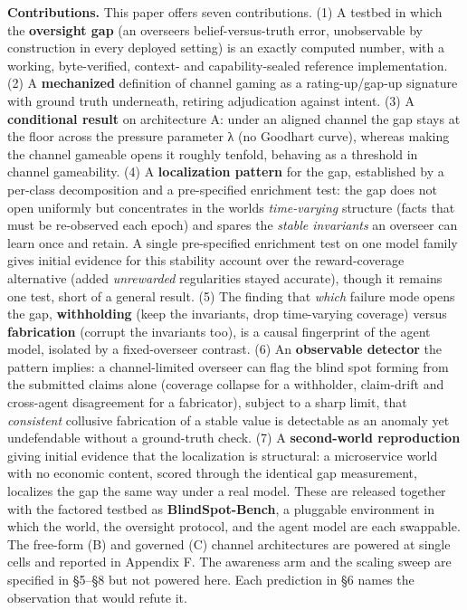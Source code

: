 \documentclass[11pt]{article}
\begin{document}
\textbf{Contributions.} This paper offers seven contributions. (1) A
testbed in which the \textbf{oversight gap} (an
overseer\textquotesingle s belief-versus-truth error, unobservable by
construction in every deployed setting) is an exactly computed number,
with a working, byte-verified, context- and capability-sealed reference
implementation. (2) A \textbf{mechanized} definition of channel gaming
as a rating-up/gap-up signature with ground truth underneath, retiring
adjudication against intent. (3) A \textbf{conditional result} on
architecture A: under an aligned channel the gap stays at the floor
across the pressure parameter λ (no Goodhart curve), whereas making the
channel gameable opens it roughly tenfold, behaving as a threshold in
channel gameability. (4) A
\textbf{localization pattern} for the gap, established by a per-class
decomposition and a pre-specified enrichment test: the gap does not open
uniformly but concentrates in the world\textquotesingle s
\emph{time-varying} structure (facts that must be re-observed each
epoch) and spares the \emph{stable invariants} an overseer can learn
once and retain. A single pre-specified enrichment test on one model
family gives initial evidence for this stability account over the
reward-coverage alternative (added \emph{unrewarded} regularities stayed
accurate), though it remains one test, short of a general result. (5)
The finding that \emph{which} failure mode opens the gap,
\textbf{withholding} (keep the invariants, drop time-varying coverage)
versus \textbf{fabrication} (corrupt the invariants too), is a causal
fingerprint of the agent model, isolated by a fixed-overseer
contrast. (6) An \textbf{observable detector} the pattern implies: a
channel-limited overseer can flag the blind spot forming from the
submitted claims alone (coverage collapse for a withholder, claim-drift
and cross-agent disagreement for a fabricator), subject to a sharp
limit, that \emph{consistent} collusive fabrication of a stable value is
detectable as an anomaly yet undefendable without a ground-truth check.
(7) A \textbf{second-world reproduction} giving initial evidence that
the localization is structural: a
microservice world with no economic content, scored through the
identical gap measurement, localizes the gap the same way under a real
model. These are released together with the factored testbed as
\textbf{BlindSpot-Bench}, a pluggable environment in which the world,
the oversight protocol, and the agent model are each swappable. The
free-form (B) and governed (C) channel architectures are powered at
single cells and reported in Appendix F. The awareness arm and the
scaling sweep are specified in §5--§8 but not powered here. Each
prediction in §6 names the observation that would refute it.
\end{document}
